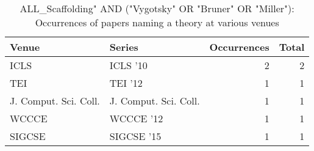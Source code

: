 \begin{table*}[t]
\begin{tabular}{llrr}
Venue & Series & Occurrences & Total\\\hline
\multirow{1}{*}{ICLS } & ICLS '10 & 2 & \multirow{1}{*}{2}\\
\multirow{1}{*}{TEI } & TEI '12 & 1 & \multirow{1}{*}{1}\\
\multirow{1}{*}{J. Comput. Sci. Coll.} & J. Comput. Sci. Coll. & 1 & \multirow{1}{*}{1}\\
\multirow{1}{*}{WCCCE } & WCCCE '12 & 1 & \multirow{1}{*}{1}\\
\multirow{1}{*}{SIGCSE } & SIGCSE '15 & 1 & \multirow{1}{*}{1}\\
\end{tabular}
\caption{ALL\_Scaffolding" AND ("Vygotsky" OR "Bruner" OR "Miller"): Occurrences of papers naming a theory at various venues}
\end{table*}